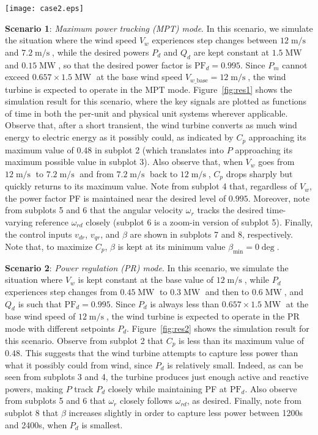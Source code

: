 \documentclass[journal]{IEEEtran}
\begin{document}
\begin{figure*}[tb]
\centering\texttt{[image: case2.eps]}
\caption{Scenario 2 illustrating the power regulation (PR) mode.}
\label{fig:res2}
\end{figure*}

{\bf Scenario 1}: {\em Maximum power tracking (MPT) mode}.
In this scenario, we simulate the situation where the wind speed $V_w$ experiences step changes between $12\operatorname{m/s}$ and $7.2\operatorname{m/s}$, while the desired powers $P_d$ and $Q_d$ are kept constant at $1.5\operatorname{MW}$ and $0.15\operatorname{MW}$, so that the desired power factor is $\text{PF}_d=0.995$. Since $P_m$ cannot exceed $0.657\times1.5\operatorname{MW}$ at the base wind speed $V_{w\_\text{base}}=12\operatorname{m/s}$, the wind turbine is expected to operate in the MPT mode. Figure~\ref{fig:res1} shows the simulation result for this scenario, where the key signals are plotted as functions of time in both the per-unit and physical unit systems wherever applicable. Observe that, after a short transient, the wind turbine converts as much wind energy to electric energy as it possibly could, as indicated by $C_p$ approaching its maximum value of $0.48$ in subplot 2 (which translates into $P$ approaching its maximum possible value in subplot 3). Also observe that, when $V_w$ goes from $12\operatorname{m/s}$ to $7.2\operatorname{m/s}$ and from $7.2\operatorname{m/s}$ back to $12\operatorname{m/s}$, $C_p$ drops sharply but quickly returns to its maximum value. Note from subplot 4 that, regardless of $V_w$, the power factor PF is maintained near the desired level of $0.995$. Moreover, note from subplots 5 and 6 that the angular velocity $\omega_r$ tracks the desired time-varying reference $\omega_{rd}$ closely (subplot 6 is a zoom-in version of subplot 5). Finally, the control inputs $v_{dr}$, $v_{qr}$, and $\beta$ are shown in subplots 7 and 8, respectively. Note that, to maximize $C_p$, $\beta$ is kept at its minimum value $\beta_{\min}=0\operatorname{deg}$.

{\bf Scenario 2}: {\em Power regulation (PR) mode}.
In this scenario, we simulate the situation where $V_w$ is kept constant at the base value of $12\operatorname{m/s}$, while $P_d$ experiences step changes from $0.45\operatorname{MW}$ to $0.3\operatorname{MW}$ and then to $0.6\operatorname{MW}$, and $Q_d$ is such that $\text{PF}_d=0.995$. Since $P_d$ is always less than $0.657\times1.5\operatorname{MW}$ at the base wind speed of $12\operatorname{m/s}$, the wind turbine is expected to operate in the PR mode with different setpoints $P_d$. Figure~\ref{fig:res2} shows the simulation result for this scenario. Observe from subplot 2 that $C_p$ is less than its maximum value of $0.48$. This suggests that the wind turbine attempts to capture less power than what it possibly could from wind, since $P_d$ is relatively small. Indeed, as can be seen from subplots 3 and 4, the turbine produces just enough active and reactive powers, making $P$ track $P_d$ closely while maintaining PF at $\text{PF}_d$. Also observe from subplots 5 and 6 that $\omega_r$ closely follows $\omega_{rd}$, as desired. Finally, note from subplot 8 that $\beta$ increases slightly in order to capture less power between 1200s and 2400s, when $P_d$ is smallest.
\end{document}
